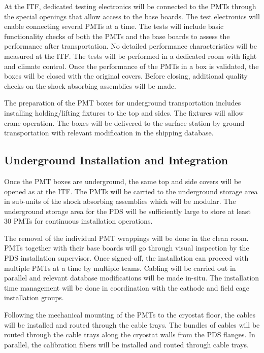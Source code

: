 At the ITF, dedicated testing electronics will be connected to the PMTs through the special openings that allow access to the base boards. The test electronics will enable connecting several PMTs at a time. The tests will include basic functionality checks of both the PMTs and the base boards to assess the performance after transportation. No detailed performance characteristics will be measured at the ITF. The tests will be performed in a dedicated room with light and climate control. Once the performance of the PMTs in a box is validated, the boxes will be closed with the original covers. Before closing, additional quality checks on the shock absorbing assemblies will be made.

The preparation of the PMT boxes for underground transportation includes installing holding/lifting fixtures to the top and sides. The fixtures will allow crane operation. The boxes will be delivered to the surface station by ground transportation with relevant modification in the shipping database.

\subsection{Underground Installation and Integration}
\label{sec:fddp-pd-9.3}

Once the PMT boxes are underground, the same top and side covers will be opened as at the ITF. The PMTs will be carried to the underground storage area in sub-units of the shock absorbing assemblies which will be modular. The underground storage area for the PDS will be sufficiently large to store at least 30 PMTs for continuous installation operations.

The removal of the individual PMT wrappings will be done in the clean room. PMTs together with their base boards will go through visual inspection by the PDS installation supervisor. Once signed-off, the installation can proceed with multiple PMTs at a time by multiple teams. Cabling will be carried out in parallel and relevant database modifications will be made in-situ. The installation time management will be done in coordination with the cathode and field cage installation groups.

Following the mechanical mounting of the PMTs to the cryostat floor, the cables will be installed and routed through the cable trays. The bundles of cables will be routed through the cable trays along the cryostat walls from the PDS flanges. In parallel, the calibration fibers will be installed and routed through cable trays.

